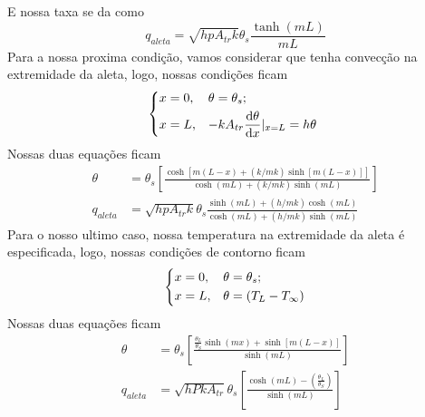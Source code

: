 E nossa taxa se da como
\begin{equation}
    q_{aleta} = \sqrt{h p A_{tr} k} \theta_s \frac{\tanh \left(mL\right)}{mL}
\end{equation}
Para a nossa proxima condição, vamos considerar que tenha convecção na extremidade da aleta, logo,
nossas condições ficam
\begin{equation}
    \begin{dcases}
        x = 0 ,& \theta = \theta_s ;\\
        x = L ,& - k A_{tr} \frac{\mathrm{d}\theta}{\mathrm{d}x}|_{x = L} = h \theta\
    \end{dcases}
\end{equation}
Nossas duas equações ficam
\begin{align}
\theta &= \theta_s \left[\frac{\cosh \left[m \left(L - x\right) + \left(k/mk\right) \sinh \left[m\left(L - x\right)\right]\right]}{\cosh \left(mL\right) + \left(k/mk\right)\sinh \left(mL\right)}  \right]\\
q_{aleta} &= \sqrt{h p A_{tr} k} \theta_s \frac{\sinh \left(mL\right) + \left(h/mk\right)\cosh \left(mL\right)}{\cosh \left(mL\right) + \left(h/mk\right)\sinh \left(mL\right)}
\end{align}
Para o nosso ultimo caso, nossa temperatura na extremidade da aleta é especificada, logo, nossas
condições de contorno ficam
\begin{align}
    \begin{dcases}
        x = 0 ,& \theta = \theta_s ;\\
        x = L ,& \theta = \left(T_L - T_\infty \right)
    \end{dcases}
\end{align}
Nossas duas equações ficam
\begin{align}
    \theta &= \theta_s \left[\frac{\frac{\theta_L}{\theta_S}\sinh(mx) + \sinh \left[m\left(L - x\right)\right]}{\sinh \left(mL\right)} \right]\\
    q_{aleta} &= \sqrt{h P k A_{tr}} \theta_s \left[\frac{\cosh \left(mL\right) - \left(\frac{\theta_L}{\theta_S}\right)}{\sinh\left(mL\right)}\right]
\end{align}
